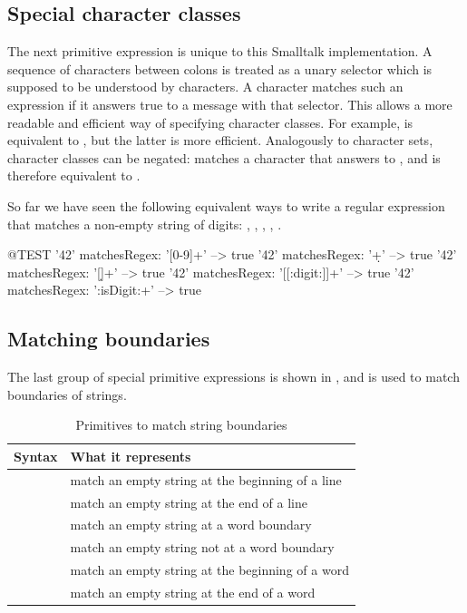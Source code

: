 \documentclass[a4paper,10pt,twoside]{book}
\begin{document}
{\subsection{Special character classes}
The next primitive expression is unique to this Smalltalk implementation. A sequence of characters between colons is treated as a unary selector which is supposed to be understood by characters. A character matches such an expression if it answers true to a message with that selector. This allows a more readable and efficient way of specifying character classes. For example, \ct{[0-9]} is equivalent to , but the latter is more efficient. Analogously to character sets, character classes can be negated:  matches a character that answers  to , and is therefore equivalent to \ct{[CARET0-9]}.

So far we have seen the following equivalent ways to write a regular expression that matches a non-empty string of digits: \ct{[0-9]+}, , \ct{[\d]+}, \ct{[[:digit:]]+}, .

\begin{code}{@TEST}
'42' matchesRegex: '[0-9]+'      --> true
'42' matchesRegex: '\d+'           --> true
'42' matchesRegex: '[\d]+'         --> true
'42' matchesRegex: '[[:digit:]]+' --> true
'42' matchesRegex: ':isDigit:+'  --> true
\end{code}

\subsection{Matching boundaries}
The last group of special primitive expressions is shown in , and is used to match boundaries of strings.

\begin{table}[htb]
\centering
	\begin{tabular}{lp{8cm}}
		\toprule
		Syntax & What it represents \\
		\midrule
		\lct{\caret} & match an empty string at the beginning of a line\\
		\lct{\$} & match an empty string at the end of a line\\
		\lct{{\escape}b} & match an empty string at a word boundary\\
		\lct{{\escape}B} & match an empty string not at a word boundary\\
		\lct{{\escape}<} & match an empty string at the beginning of a word\\
		\lct{{\escape}>} & match an empty string at the end of a word\\
		\bottomrule
	\end{tabular}
	\caption{Primitives to match string boundaries}
\end{table}

}
\end{document}
